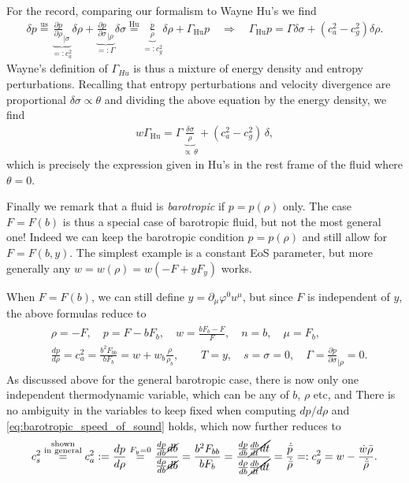 For the record, comparing our formalism to Wayne Hu's \cite[equation (3)]{Hu:1998kj} we find
\begin{align}
    \delta p\overset{\text{us}}{=} \underbrace{\tfrac{\partial p}{\partial \rho}_{|\sigma}}_{=:c_a^2}\delta\rho + \underbrace{\tfrac{\partial p}{\partial \sigma}_{|\rho}}_{=:\Gamma}\delta\sigma \overset{\text{Hu}}{=} \underbrace{\tfrac{\dot{p}}{\dot{\rho}}}_{=:c_g^2} \delta \rho + \Gamma_{\text{Hu}} p
    \quad\Rightarrow\quad \Gamma_{\text{Hu}} p = \Gamma \delta\sigma + (c_a^2-c_g^2)\delta\rho.
\end{align}
Wayne's definition of $\Gamma_{Hu}$ is thus a mixture of energy density and entropy perturbations.
Recalling that entropy perturbations and velocity divergence are proportional $\delta\sigma \propto \theta$ and dividing the above equation by the energy density, we find
\begin{align}
    w\Gamma_{\text{Hu}} = \Gamma \underbrace{\tfrac{\delta\sigma}{\rho}}_{\propto\, \theta}+ (c_a^2-c_g^2)\,\delta,
\end{align}
which is precisely the expression given in Hu's \cite[equation (3)]{Hu:1998kj} in the rest frame of the fluid where $\theta=0$.


Finally we remark that a fluid is \emph{barotropic} if $p=p(\rho)$ only.
The case $F=F(b)$ is thus a special case of barotropic fluid, but not the most general one!
Indeed we can keep the barotropic condition $p=p(\rho)$ and still allow for  $F=F(b,y)$.
The simplest example is a constant EoS parameter, but more generally any $w=w(\rho)=w(-F+yF_y)$ works.

When $F=F(b)$, we can still define $y=\partial_\mu\varphi^0u^\mu$, but since $F$ is independent of $y$, the above formulas reduce to
{\small\begin{align}\label{eq:thermo_variables_barotropic}
\begin{aligned}
    &\rho=-F,\quad p=F-bF_b,\quad w=\frac{bF_b-F}{F},\quad n=b,\quad \mu=F_b,\\[3pt]
    & \frac{d p}{d \rho}=c_a^2=\frac{b^2F_{bb}}{bF_b}= w+w_b \frac{\rho}{\rho_b},\qquad T=y,\quad s=\sigma=0,\quad \Gamma=\frac{\partial p}{\partial \sigma}_{|\rho}=0.
\end{aligned}\end{align}}
As discussed above for the general barotropic case, there is now only one independent thermodynamic variable, which can be any of $b$, $\rho$ etc, and 
There is no ambiguity in the variables to keep fixed when computing $dp/d\rho$ and \eqref{eq:barotropic_speed_of_sound} holds, which now further reduces to
\begin{align}
    c_s^2\overset{\substack{\text{shown}\\ \text{in general}}}{=}
c_a^2:=\frac{dp}{d\rho}\overset{F_y=0}{=}\frac{\tfrac{dp}{db}\cancel{db}}{\tfrac{d\rho}{db}\cancel{db}}= \frac{b^2F_{bb}}{bF_b}=\frac{\tfrac{dp}{db}\cancel{\tfrac{db}{dt}dt}}{\tfrac{d\rho}{db}\cancel{\tfrac{db}{dt}dt}}=
    \frac{\dot{\bar{p}}}{\dot{\bar{\rho}}}=:c_g^2= w-\frac{\dot{w}\bar{\rho}}{\dot{\bar{\rho}}}.
\end{align}



